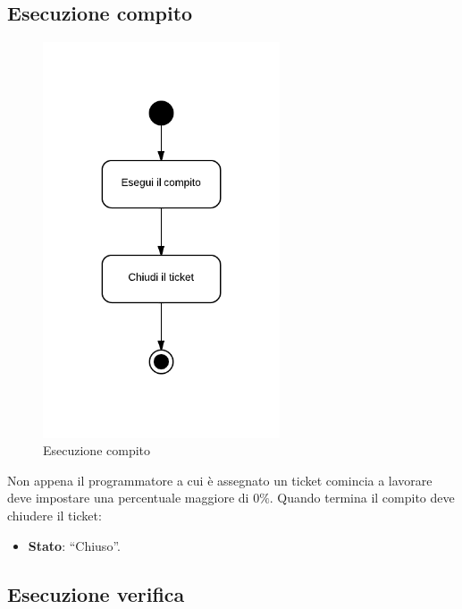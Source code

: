 \subsection{Esecuzione compito}

\begin{figure}[H]
    \centering
    \includegraphics[width=7cm]{uml-processi/Esecuzione_compito.png}
    \caption{Esecuzione compito}
\end{figure}

Non appena il programmatore a cui è assegnato un ticket comincia a lavorare deve impostare una percentuale maggiore di $0\%$. Quando termina il compito deve chiudere il ticket:
\begin{itemize}
 \item \textbf{Stato}: ``Chiuso''.
\end{itemize}
 
\subsection{Esecuzione verifica}

